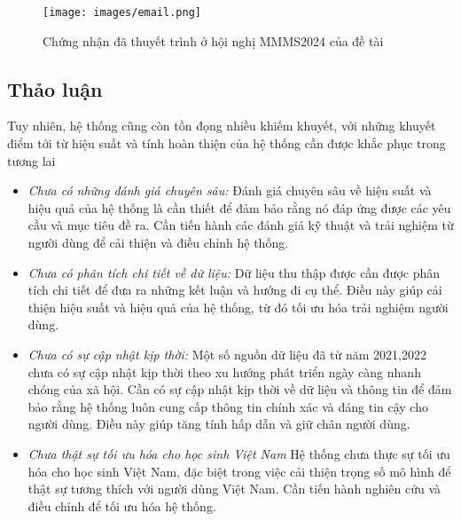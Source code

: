         \begin{figure}[H]
            \centering
            \texttt{[image: images/email.png]}
            \vspace{0.6cm}
            \caption{Chứng nhận đã thuyết trình ở hội nghị MMMS2024 của đề tài}
        \end{figure}
    \subsection{Thảo luận}
        Tuy nhiên, hệ thống cũng còn tồn đọng nhiều khiếm khuyết, với những khuyết điểm tới từ hiệu suất và tính hoàn thiện của hệ thống cần được khắc phục trong tương lai
        \begin{itemize}
            \item \textit{Chưa có những đánh giá chuyên sâu:} Đánh giá chuyên sâu về hiệu suất và hiệu quả của hệ thống là cần thiết để đảm bảo rằng nó đáp ứng được các yêu cầu và mục tiêu đề ra. Cần tiến hành các đánh giá kỹ thuật và trải nghiệm từ người dùng để cải thiện và điều chỉnh hệ thống.
            \item \textit{Chưa có phân tích chi tiết về dữ liệu:} Dữ liệu thu thập được cần được phân tích chi tiết để đưa ra những kết luận và hướng đi cụ thể. Điều này giúp cải thiện hiệu suất và hiệu quả của hệ thống, từ đó tối ưu hóa trải nghiệm người dùng.
            \item \textit{Chưa có sự cập nhật kịp thời:} Một số nguồn dữ liệu đã từ năm 2021,2022 chưa có sự cập nhật kịp thời theo xu hướng phát triển ngày càng nhanh chóng của xã hội. Cần có sự cập nhật kịp thời về dữ liệu và thông tin để đảm bảo rằng hệ thống luôn cung cấp thông tin chính xác và đáng tin cậy cho người dùng. Điều này giúp tăng tính hấp dẫn và giữ chân người dùng.
            \item \textit{Chưa thật sự tối ưu hóa cho học sinh Việt Nam} Hệ thống chưa thực sự tối ưu hóa cho học sinh Việt Nam, đặc biệt trong việc cải thiện trọng số mô hình để thật sự tương thích với  người dùng Việt Nam. Cần tiến hành nghiên cứu và điều chỉnh để tối ưu hóa hệ thống.
        \end{itemize}